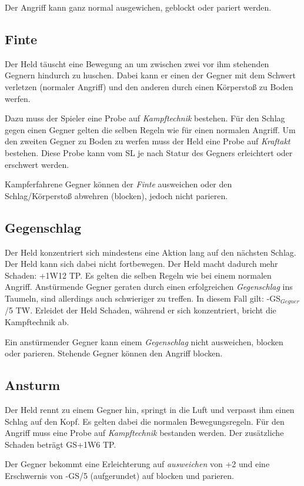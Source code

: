 Der Angriff kann ganz normal ausgewichen, geblockt oder pariert werden.

\subsection{Finte}
Der Held täuscht eine Bewegung an um zwischen zwei vor ihm stehenden Gegnern hindurch zu huschen. Dabei kann er einen der Gegner mit dem Schwert verletzen (normaler Angriff) und den anderen durch einen Körperstoß zu Boden werfen.

Dazu muss der Spieler eine Probe auf \textit{Kampftechnik} bestehen. Für den Schlag gegen einen Gegner gelten die selben Regeln wie für einen normalen Angriff. Um den zweiten Gegner zu Boden zu werfen muss der Held eine Probe auf \textit{Kraftakt} bestehen. Diese Probe kann vom SL je nach Statur des Gegners erleichtert oder erschwert werden. 

Kampferfahrene Gegner können der \textit{Finte} ausweichen oder den Schlag/Körperstoß abwehren (blocken), jedoch nicht parieren. 

\subsection{Gegenschlag}
Der Held konzentriert sich mindestens eine Aktion lang auf den nächsten Schlag. Der Held kann sich dabei nicht fortbewegen. Der Held macht dadurch mehr Schaden: +1W12 TP. Es gelten die selben Regeln wie bei einem normalen Angriff. Anstürmende Gegner geraten durch einen erfolgreichen \textit{Gegenschlag} ins Taumeln, sind allerdings auch schwieriger zu treffen. In diesem Fall gilt: -GS$_{Gegner}$/5 TW. Erleidet der Held Schaden, während er sich konzentriert, bricht die Kampftechnik ab.

Ein anstürmender Gegner kann einem \textit{Gegenschlag} nicht ausweichen, blocken oder parieren. Stehende Gegner können den Angriff blocken.

\subsection{Ansturm}
Der Held rennt zu einem Gegner hin, springt in die Luft und verpasst ihm einen Schlag auf den Kopf. Es gelten dabei die normalen Bewegungsregeln. Für den Angriff muss eine Probe auf \textit{Kampftechnik} bestanden werden. Der zusätzliche Schaden beträgt GS+1W6 TP.

Der Gegner bekommt eine Erleichterung auf \textit{ausweichen} von +2 und eine Erschwernis von -GS/5 (aufgerundet) auf blocken und parieren.